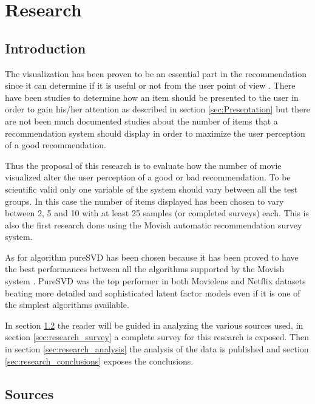\chapter{Research}
\label{chapter:<research_number_of_items>}

\section{Introduction}
\label{sec:research_introduction}

The visualization has been proven to be an essential part in the recommendation since it can determine if it is useful or not from the user point of view \cite{trust-building}. There have been studies to determine how an item should be presented to the user in order to gain his/her attention as described in section \ref{sec:Presentation} but there are not been much documented studies about the number of items that a recommendation system should display in order to maximize the user perception of a good recommendation.

Thus the proposal of this research is to evaluate how the number of movie visualized alter the user perception of a good or bad recommendation. To be scientific valid only one variable of the system should vary between all the test groups. In this case the number of items displayed has been chosen to vary between 2, 5 and 10 with at least 25 samples (or completed surveys) each. This is also the first research done using the Movish automatic recommendation survey system.  

As for algorithm pureSVD has been chosen because it has been proved to have the best performances between all the algorithms supported by the Movish system \cite{performance-recommender-algorithms}. PureSVD was the top performer in both Movielens \cite{movielens} and Netflix \cite{netflixprize} datasets beating more detailed and sophisticated latent factor models even if it is one of the simplest algorithms available.

In section \ref{sec:research_sources} the reader will be guided in analyzing the various sources used, in section \ref{sec:research_survey} a complete survey for this research is exposed. Then in section \ref{sec:research_analysis} the analysis of the data is published and section \ref{sec:research_conclusions} exposes the conclusions.

\section{Sources}
\label{sec:research_sources}

